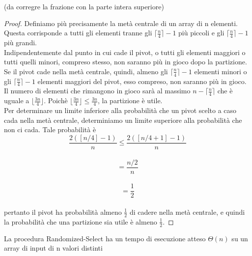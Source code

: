 (da corregre la frazione con la parte intera superiore)\\
\begin{proof}
Definiamo più precisamente la metà centrale di un array di n elementi. Questa corrisponde a tutti gli elementi tranne gli $\lceil \frac{n}{4} \rceil-1$ più piccoli e gli $\lceil \frac{n}{4} \rceil -1$ più grandi.\\
Indipendentemente dal punto in cui cade il pivot, o tutti gli elementi maggiori o tutti quelli minori, compreso stesso, non saranno più in gioco dopo la partizione. Se il pivot cade nella metà centrale, quindi, almeno gli $\lceil \frac{n}{4} \rceil -1$ elementi minori o gli $\lceil \frac{n}{4} \rceil -1$ elementi maggiori del pivot, esso  compreso, non saranno più in gioco. Il numero di elementi che rimangono in gioco sarà al massimo $n- \lceil \frac{n}{4} \rceil $ che è uguale a $\lfloor \frac{3n}{4} \rfloor$. Poichè $\lfloor \frac{3n}{4} \rfloor \le \frac{3n}{4}$, la partizione è utile.\\
Per determinare un limite inferiore alla probabilità che un pivot scelto a caso cada nella metà centrale, determiniamo un limite superiore alla probabilità che non ci cada. Tale probabilità è\\
$$ \frac{2([n/4]-1)}{n} \le \frac{2([n/4+1]-1)}{n}$$\\
$$=\frac{n/2}{n}$$\\
$$=\frac{1}{2}$$\\
pertanto il pivot ha probabilità almeno $\frac{1}{2}$ di cadere nella metà centrale, e quindi la probabilità che una partizione sia utile è almeno $\frac{1}{2}$.
\end{proof}
\noindent
\colorbox{SALZO}{\parbox{\dimexpr\linewidth-2\fboxsep}{\begin{theorem}
La procedura Randomized-Select ha un tempo di esecuzione atteso $\Theta(n)$ su un array di input di n valori distinti    
\end{theorem}}}\smallskip\\
